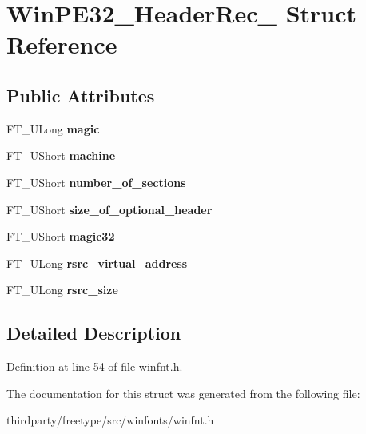 \hypertarget{struct_win_p_e32___header_rec__}{}\section{Win\+P\+E32\+\_\+\+Header\+Rec\+\_\+ Struct Reference}
\label{struct_win_p_e32___header_rec__}
\subsection*{Public Attributes}
\begin{DoxyCompactItemize}
\item 
\mbox{\label{struct_win_p_e32___header_rec___a8a706f4efa9d6cfa3212054cd4d40926}} 
F\+T\+\_\+\+U\+Long {\bfseries magic}
\item 
\mbox{\label{struct_win_p_e32___header_rec___ab6cfc39db8a1683b93ee6771acc7d8f7}} 
F\+T\+\_\+\+U\+Short {\bfseries machine}
\item 
\mbox{\label{struct_win_p_e32___header_rec___ab2843afaa320ebc51b2ee48046088a31}} 
F\+T\+\_\+\+U\+Short {\bfseries number\+\_\+of\+\_\+sections}
\item 
\mbox{\label{struct_win_p_e32___header_rec___ad75f351dccabc90e5648f960f5731e9a}} 
F\+T\+\_\+\+U\+Short {\bfseries size\+\_\+of\+\_\+optional\+\_\+header}
\item 
\mbox{\label{struct_win_p_e32___header_rec___ae0cefb11bf49cbb2e7cfd7acf0d247d4}} 
F\+T\+\_\+\+U\+Short {\bfseries magic32}
\item 
\mbox{\label{struct_win_p_e32___header_rec___ad3eb270b628c0ccc4e552edaad685d2b}} 
F\+T\+\_\+\+U\+Long {\bfseries rsrc\+\_\+virtual\+\_\+address}
\item 
\mbox{\label{struct_win_p_e32___header_rec___a1ff2185baf156d98b27554188e0a04fe}} 
F\+T\+\_\+\+U\+Long {\bfseries rsrc\+\_\+size}
\end{DoxyCompactItemize}


\subsection{Detailed Description}


Definition at line 54 of file winfnt.\+h.



The documentation for this struct was generated from the following file\+:\begin{DoxyCompactItemize}
\item 
thirdparty/freetype/src/winfonts/winfnt.\+h\end{DoxyCompactItemize}
